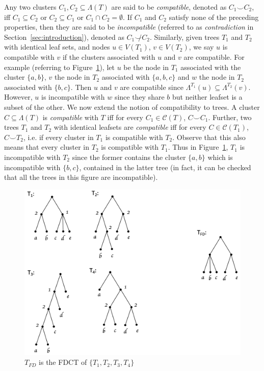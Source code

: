 \documentclass{article}
\newcommand{\compatible}{\smile}
\newcommand{\leafset}{\Lambda}
\begin{document}
    Any two clusters $C_1, C_2 \subseteq \leafset(T)$ are said to be \textit{compatible}, denoted as $C_1 \compatible C_2$, iff $C_1 \subseteq C_2$ or $C_2 \subseteq C_1$ or $C_1 \cap C_2 = \emptyset$. If $C_1$ and $C_2$ satisfy none of the preceding properties, then they are said to be \textit{incompatible} (referred to as \textit{contradiction} in Section~\ref{sec:introduction}), denoted as $C_1 \not\compatible C_2$. Similarly, given trees $T_1$ and $T_2$ with identical leaf sets, and nodes $u \in V(T_1)$, $v \in V(T_2)$, we say $u$ is compatible with $v$ if the clusters associated with $u$ and $v$ are compatible. For example (referring to Figure~\ref{fig:freqdiff}), let $u$ be the node in $T_1$ associated with the cluster $\{a, b\}$, $v$ the node in $T_2$ associated with $\{a, b, c\}$ and $w$ the node in $T_2$ associated with $\{b, c\}$. Then $u$ and $v$ are compatible since $\leafset^{T_1}(u) \subseteq \leafset^{T_2}(v)$. However, $u$ is incompatible with $w$ since they share $b$ but neither leafset is a subset of the other. We now extend the notion of compatibility to trees. A cluster $C \subseteq \leafset(T)$ is \textit{compatible} with $T$ iff for every $C_1 \in \mathcal{C}(T)$, $C \compatible C_1$. Further, two trees $T_1$ and $T_2$ with identical leafsets are \textit{compatible} iff for every $C \in \mathcal{C}(T_1)$, $C \compatible T_2$, i.e. if every cluster in $T_1$ is compatible with $T_2$. Observe that this also means that every cluster in $T_2$ is compatible with $T_1$. Thus in Figure~\ref{fig:freqdiff}, $T_1$ is incompatible with $T_2$ since the former contains the cluster $\{a, b\}$ which is incompatible with $\{b, c\}$, contained in the latter tree (in fact, it can be checked that all the trees in this figure are incompatible).

    \begin{figure}[h]
        \includegraphics[scale=0.5]{freqdiff}
        \centering
        \caption{$T_{FD}$ is the FDCT of $\{T_1, T_2, T_3, T_4\}$}
        \label{fig:freqdiff}
    \end{figure}
\end{document}
